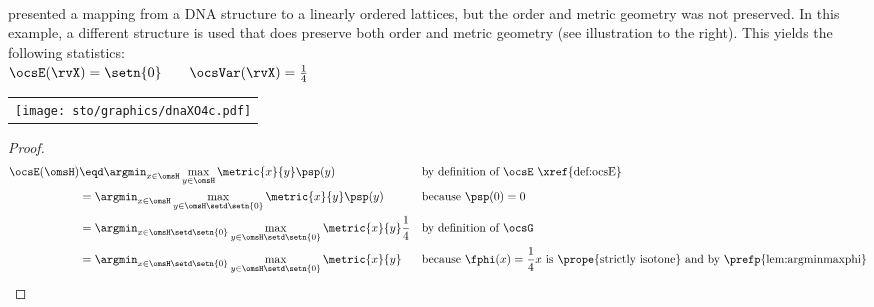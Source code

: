 \begin{tabstr}{0.75}
\begin{minipage}{\tw-70mm}%
\begin{example}
\label{ex:dnaXO4c}\mbox{}\\
 presented a mapping from a DNA structure to a linearly ordered lattices,
but the order and metric geometry was not preserved.
In this example, a different structure is used that does preserve both order and metric geometry
(see illustration to the right). This yields the following statistics:
\\\indentx$\ocsE(\rvX) = \setn{0} \qquad  \ocsVar (\rvX) = \frac{1}{4}$
\end{example}
\end{minipage}\hfill%
\begin{tabular}{c}
  \gsize%
  {\texttt{[image: sto/graphics/dnaXO4c.pdf]}}%
\end{tabular}
\begin{proof}
\begin{align*}
  \ocsE(\omsH)
    &\eqd \argmin_{x\in\omsH}\max_{y\in\omsH}\metric{x}{y}\psp(y)
    &&\text{by definition of $\ocsE$ \xref{def:ocsE}}
  \\&= \argmin_{x\in\omsH}\max_{y\in\omsH\setd\setn{0}}\metric{x}{y}\psp(y)
    &&\text{because $\psp(0)=0$}
  \\&= \argmin_{x\in\omsH\setd\setn{0}}\max_{y\in\omsH\setd\setn{0}}\metric{x}{y}\frac{1}{4}
    && \text{by definition of $\ocsG$}
  \\&= \argmin_{x\in\omsH\setd\setn{0}}\max_{y\in\omsH\setd\setn{0}}\metric{x}{y}
    && \text{because $\fphi(x)=\frac{1}{4}x$ is \prope{strictly isotone} and by \prefp{lem:argminmaxphi}}

\end{align*}
\end{proof}
\end{tabstr}
